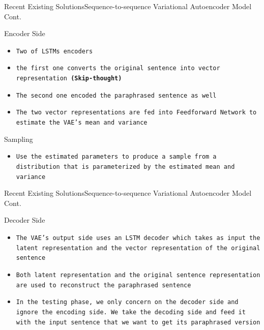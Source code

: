 \documentclass[10pt]{beamer}
\begin{document}
\begin{frame}{Recent Existing Solutions}{Sequence-to-sequence Variational Autoencoder Model Cont.}
	\begin{block}{Encoder Side}
            \begin{itemize}
				\item {\tt Two of LSTMs encoders}
                \item {\tt the first one converts the original sentence into vector representation \textbf{(Skip-thought)}}
                \item {\tt The second one encoded the paraphrased sentence as well}
                \item {\tt The two vector representations are fed into Feedforward Network to estimate the VAE's mean and variance}
			\end{itemize}
	\end{block}
    
    \begin{block}{Sampling}
            \begin{itemize}
				\item {\tt Use the estimated parameters to produce a sample from a distribution that is parameterized by the estimated mean and variance}
			\end{itemize}
	\end{block}
\end{frame}

\begin{frame}{Recent Existing Solutions}{Sequence-to-sequence Variational Autoencoder Model Cont.}

\begin{block}{Decoder Side}
            \begin{itemize}
				\item {\tt The VAE’s output side uses an LSTM decoder which takes as input the latent representation and the vector representation of the original sentence}
                \item {\tt Both latent representation and the original sentence representation are used to reconstruct the paraphrased sentence}
                \item {\tt In the testing phase, we only concern on the decoder side and ignore the encoding side. We take the decoding side and feed it with the input sentence that we want to get its paraphrased version}
			\end{itemize}
	\end{block}
\end{frame}
\end{document}
